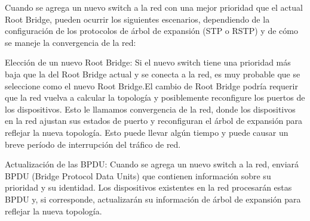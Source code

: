 \documentclass[a4paper]{article}
\begin{document}
\begin{enumerate}
Cuando se agrega un nuevo switch a la red con una mejor prioridad que el actual Root Bridge, pueden ocurrir los siguientes escenarios, dependiendo de la configuración de los protocolos de árbol de expansión (STP o RSTP) y de cómo se maneje la convergencia de la red:

Elección de un nuevo Root Bridge: Si el nuevo switch tiene una prioridad más baja que la del Root Bridge actual y se conecta a la red, es muy probable que se seleccione como el nuevo Root Bridge.El cambio de Root Bridge podría requerir que la red vuelva a calcular la topología y posiblemente reconfigure los puertos de los dispositivos. Esto le llamamos convergencia de la red, donde los dispositivos en la red ajustan sus estados de puerto y reconfiguran el árbol de expansión para reflejar la nueva topología. Esto puede llevar algún tiempo y puede causar un breve período de interrupción del tráfico de red.

Actualización de las BPDU: Cuando se agrega un nuevo switch a la red, enviará BPDU (Bridge Protocol Data Units) que contienen información sobre su prioridad y su identidad. Los dispositivos existentes en la red procesarán estas BPDU y, si corresponde, actualizarán su información de árbol de expansión para reflejar la nueva topología.

\end{enumerate}
\end{document}
